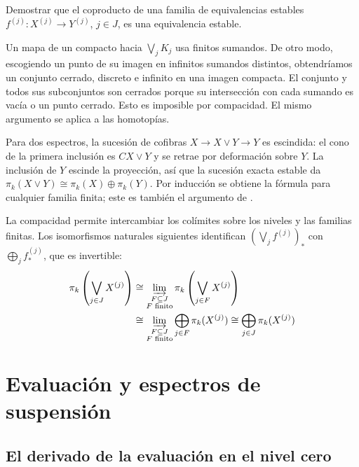 \begin{ejer}\label{ejer:c14-coproductos}
Demostrar que el coproducto de una familia de equivalencias estables $f^{(j)}\colon X^{(j)}\to Y^{(j)}$, $j\in J$, es una equivalencia estable.
\end{ejer}
\begin{sol}
Un mapa de un compacto hacia $\bigvee_jK_j$ usa finitos sumandos. De otro modo, escogiendo un punto de su imagen en infinitos sumandos distintos, obtendríamos un conjunto cerrado, discreto e infinito en una imagen compacta. El conjunto y todos sus subconjuntos son cerrados porque su intersección con cada sumando es vacía o un punto cerrado. Esto es imposible por compacidad. El mismo argumento se aplica a las homotopías.

Para dos espectros, la sucesión de cofibras $X\to X\vee Y\to Y$ es escindida: el cono de la primera inclusión es $CX\vee Y$ y se retrae por deformación sobre $Y$. La inclusión de $Y$ escinde la proyección, así que la sucesión exacta estable da $\pi_k(X\vee Y)\cong\pi_k(X)\oplus\pi_k(Y)$. Por inducción se obtiene la fórmula para cualquier familia finita; este es también el argumento de \cite[Proposición~2.4.4.3]{malkiewich}.

La compacidad permite intercambiar los colímites sobre los niveles y las familias finitas. Los isomorfismos naturales siguientes identifican $(\bigvee_jf^{(j)})_*$ con $\bigoplus_jf^{(j)}_*$, que es invertible:
\[
\begin{aligned}
\pi_k\left(\bigvee_{j\in J}X^{(j)}\right)
&\cong\varinjlim_{\substack{F\subseteq J\\F\text{ finito}}}
\pi_k\left(\bigvee_{j\in F}X^{(j)}\right)\\
&\cong\varinjlim_{\substack{F\subseteq J\\F\text{ finito}}}
\bigoplus_{j\in F}\pi_k(X^{(j)})
\cong\bigoplus_{j\in J}\pi_k(X^{(j)})
\end{aligned}
\]
\end{sol}

\section{Evaluación y espectros de suspensión}

\subsection{El derivado de la evaluación en el nivel cero}

